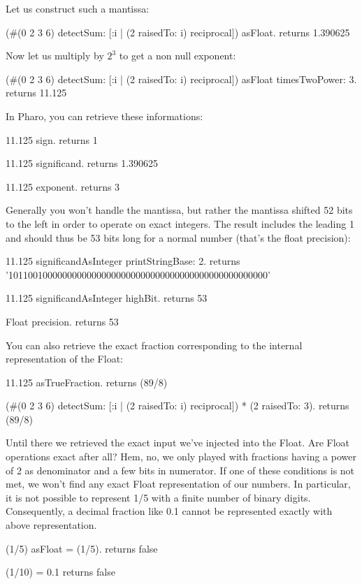\documentclass[a4paper,10pt,twoside]{book}
\begin{document}
Let us construct such a mantissa:
\begin{code}{}
(#(0 2 3 6) detectSum: [:i | (2 raisedTo: i) reciprocal]) asFloat.
	returns 1.390625
\end{code}

Now let us multiply by $2^3$ to get a non null exponent:
\begin{code}{}
(#(0 2 3 6) detectSum: [:i | (2 raisedTo: i) reciprocal]) asFloat timesTwoPower: 3.
	returns 11.125
\end{code}

In Pharo, you can retrieve these informations:
 \begin{code}{}
11.125 sign.
	returns 1
	
11.125 significand.
	returns 1.390625
	
11.125 exponent.
	returns 3
\end{code}

Generally you won't handle the mantissa, but rather the mantissa shifted 52 bits to the left in order to operate on exact integers. The result includes the leading 1 and should thus be 53 bits long for a normal number (that's the float precision):
 \begin{code}{}
11.125 significandAsInteger printStringBase: 2.
	returns '10110010000000000000000000000000000000000000000000000'
	
11.125 significandAsInteger highBit.
	returns 53
	
Float precision.
	returns 53
\end{code}

You can also retrieve the exact fraction corresponding to the internal representation of the Float:
 \begin{code}{}
 11.125 asTrueFraction.
	returns  (89/8)

(#(0 2 3 6) detectSum: [:i | (2 raisedTo: i) reciprocal]) * (2 raisedTo: 3).
	returns  (89/8)
\end{code}

Until there we retrieved the exact input we've injected into the Float. Are Float operations exact after all? Hem, no, we only played with fractions having a power of 2 as denominator and a few bits in numerator. If one of these conditions is not met, we won't find any exact Float representation of our numbers. In particular, it is not possible to represent 1/5 with a finite number of binary digits. Consequently, a decimal fraction like 0.1 cannot be represented exactly with above representation.
 \begin{code}{}
(1/5) asFloat = (1/5).
	returns false
	
(1/10) = 0.1
	returns false
\end{code}
\end{document}
